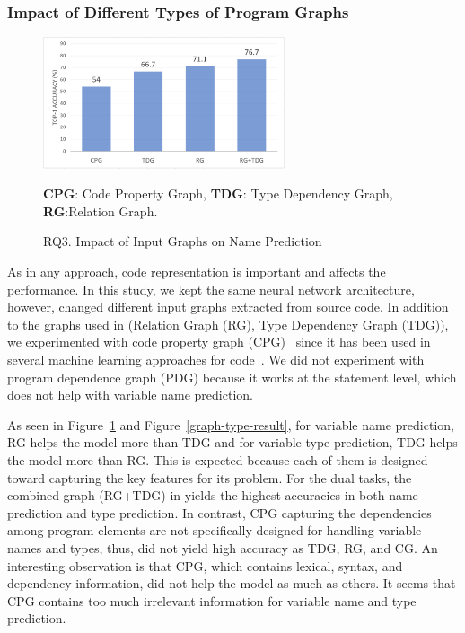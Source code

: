 \subsubsection{Impact of Different Types of Program Graphs}
\label{sec:graphs}

\begin{figure}[t]%
\begin{center}
\includegraphics[width=2.8in]{figures/sensi-graphs-name-2}
\vspace{-8pt}
\caption{RQ3. Impact of Input Graphs on Name Prediction}
\label{graph-name-result}
{\bf CPG}: Code Property Graph, {\bf TDG}: Type Dependency Graph, {\bf RG}:Relation Graph. 
\end{center}
\end{figure}



As in any approach, code representation is
important and affects the performance. In this study, we
kept the same neural network architecture, however, changed different
input graphs extracted from source code. In addition to the graphs
used in {\tool} (Relation Graph (RG), Type Dependency Graph (TDG)), we
experimented with code property graph (CPG)~\cite{CPG-2014} since
it has been used in several machine learning approaches for
code~\cite{CPG-2014}. We did not experiment with program dependence
graph (PDG) because it works at the statement level, which does not
help with variable name prediction.

As seen in Figure~\ref{graph-name-result} and
Figure~\ref{graph-type-result}, for variable name prediction, RG helps
the model more than TDG and for variable type prediction, TDG helps
the model more than RG. This is expected because each of them is
designed toward capturing the key features for its problem. For the
dual tasks, the combined graph (RG+TDG) in {\tool} yields the highest
accuracies in both name prediction and type prediction. In contrast,
CPG capturing the dependencies among program elements are not
specifically designed for handling variable names and types, thus, did not
yield high accuracy as TDG, RG, and CG. An interesting observation is
that CPG, which contains lexical, syntax, and dependency information,
did not help the model as much as others. It seems that CPG contains
too much irrelevant information for variable name and type prediction.

